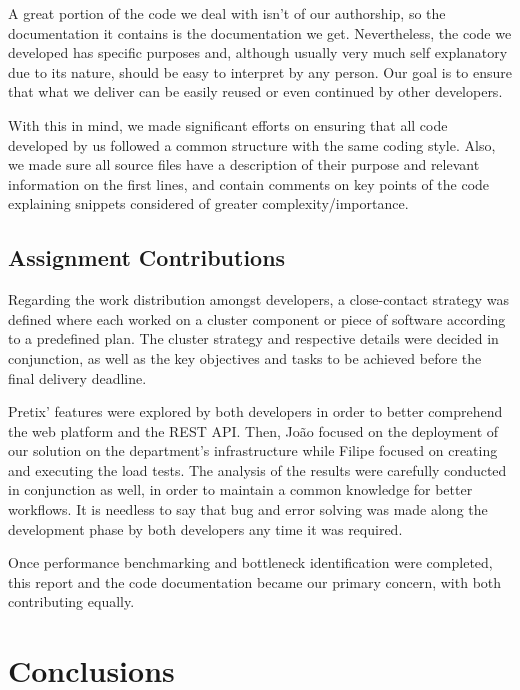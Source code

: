 \documentclass[12pt]{article}
\begin{document}

A great portion of the code we deal with isn't of our authorship, so the documentation it contains is the documentation we get.
Nevertheless, the code we developed has specific purposes and, although usually very much self explanatory due to its nature, should be easy to interpret by any person.
Our goal is to ensure that what we deliver can be easily reused or even continued by other developers.

With this in mind, we made significant efforts on ensuring that all code developed by us followed a common structure with the same coding style.
Also, we made sure all source files have a description of their purpose and relevant information on the first lines, and contain comments on key points of the 
code explaining snippets considered of greater complexity/importance.

\subsection{Assignment Contributions} \label{remarks.contributions} %


Regarding the work distribution amongst developers, a close-contact strategy was defined where each worked on a cluster component or piece of software according 
to a predefined plan. 
The cluster strategy and respective details were decided in conjunction, as well as the key objectives and tasks to be achieved before the final delivery deadline.

Pretix' features were explored by both developers in order to better comprehend the web platform and the REST API.
Then, João focused on the deployment of our solution on the department's infrastructure while Filipe focused on creating and executing the load tests.
The analysis of the results were carefully conducted in conjunction as well, in order to maintain a common knowledge for better workflows.
It is needless to say that bug and error solving was made along the development phase by both developers any time it was required.

Once performance benchmarking and bottleneck identification were completed, this report and the code documentation became our primary concern, with both 
contributing equally.

\newpage
\section*{Conclusions} \label{conclusions} %
\end{document}
